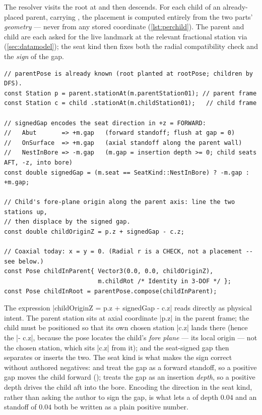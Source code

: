 The resolver visits the root at  and then descends. For each child of an
already-placed parent, carrying , the placement is computed entirely from the two
parts' \emph{geometry} --- never from any stored coordinate (\cref{lst:perchild}). The parent and
child are each asked for the live landmark at the relevant fractional station via 
(\cref{sec:datamodel}); the seat kind then fixes both the radial compatibility check and the
\emph{sign} of the gap.

\begin{listing}[htbp]
\begin{verbatim}
// parentPose is already known (root planted at rootPose; children by DFS).
const Station p = parent.stationAt(m.parentStation01); // parent frame
const Station c = child .stationAt(m.childStation01);   // child frame

// signedGap encodes the seat direction in +z = FORWARD:
//   Abut       => +m.gap   (forward standoff; flush at gap = 0)
//   OnSurface  => +m.gap   (axial standoff along the parent wall)
//   NestInBore => -m.gap   (m.gap = insertion depth >= 0; child seats AFT, -z, into bore)
const double signedGap = (m.seat == SeatKind::NestInBore) ? -m.gap : +m.gap;

// Child's fore-plane origin along the parent axis: line the two stations up,
// then displace by the signed gap.
const double childOriginZ = p.z + signedGap - c.z;

// Coaxial today: x = y = 0. (Radial r is a CHECK, not a placement -- see below.)
const Pose childInParent{ Vector3(0.0, 0.0, childOriginZ),
                          m.childRot /* Identity in 3-DOF */ };
const Pose childInRoot = parentPose.compose(childInParent);
\end{verbatim}
\caption{The per-child placement step, in \zfwd. Pure geometry: the child's fore-plane origin is
placed so the chosen child station lands on the chosen parent station, offset by the seat-signed
gap; the result is composed into the root frame.}\label{lst:perchild}
\end{listing}

The expression \cppinline|childOriginZ = p.z + signedGap - c.z| reads directly as physical intent.
The parent station sits at axial coordinate \cppinline|p.z| in the parent frame; the child must be
positioned so that its own chosen station \cppinline|c.z| lands there (hence the \cppinline|- c.z|,
because the pose locates the child's \emph{fore plane} --- its local origin --- not the chosen
station, which sits \cppinline|c.z| from it); and the seat-signed gap
then separates or inserts the two. The seat kind is what makes the sign correct without authored
negatives:  and  treat the gap as a forward standoff, so a positive gap
moves the child forward (\zfwd);  treats the gap as an insertion \emph{depth}, so a
positive depth drives the child aft into the bore. Encoding the direction in the seat kind, rather
than asking the author to sign the gap, is what lets a  of depth $0.04$ and an
 standoff of $0.04$ both be written as a plain positive number.

